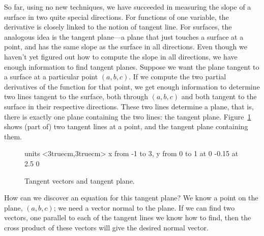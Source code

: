 So far, using no new techniques, we have succeeded in measuring the
slope of a surface in two quite special directions. For functions of
one variable, the derivative is closely linked to the notion of
tangent line. For surfaces, the analogous idea is the tangent
plane---a plane that just touches a surface at a point, and has the
same slope as the surface in all directions. Even though we
haven't yet figured out how to compute the slope in all directions, we
have enough information to find tangent planes. Suppose we want the
plane tangent to a surface at a particular point $(a,b,c)$. If we compute the
two partial derivatives of the function for that point, we get enough
information to determine two lines tangent to the surface, both 
through $(a,b,c)$ and both tangent to the surface in their respective
directions. These two lines determine a plane, that is, there is
exactly one plane containing the two lines: the tangent
plane. Figure~\ref{fig:sphere with tangent plane} 
shows (part of) two tangent lines at a point,
and the tangent plane containing them. 

\begin{figure}[H]
\centerline{
\vbox{\beginpicture
\normalgraphs
\setcoordinatesystem units <3truecm,3truecm>
\setplotarea x from -1 to 3, y from 0 to 1
 at 0 -0.15
 at 2.5 0
\endpicture}}
\caption{Tangent vectors and tangent plane.}
\label{fig:sphere with tangent plane}
\end{figure}

How can we discover an equation for this tangent plane? We know a
point on the plane, $(a,b,c)$; we need a vector normal to the
plane. If we can find two vectors, one parallel to each of the tangent
lines we know how to find, then the cross product of these vectors
will give the desired normal vector.

